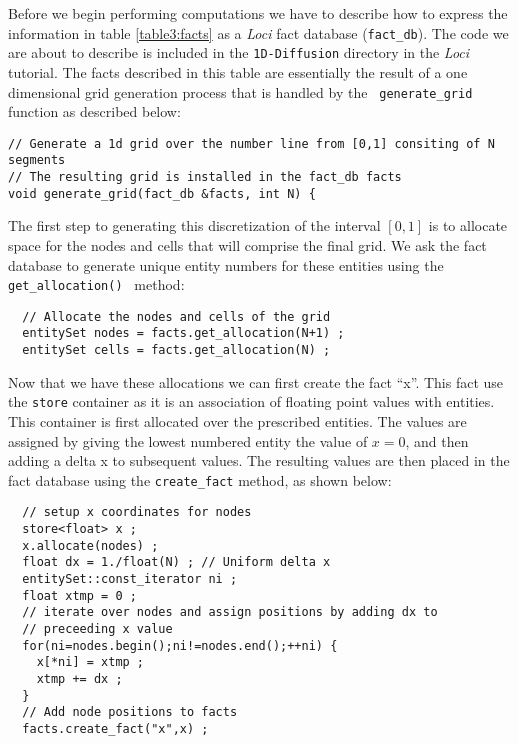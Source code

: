\documentclass[10pt,epsf,letterpaper,twoside]{book}
\begin{document}
Before we begin performing computations we have to describe how to
express the information in table \ref{table3:facts} as a {\it Loci} fact
database ({\tt fact\_db}).  The code we are about to describe is
included in the {\tt 1D-Diffusion} directory in the {\it Loci} tutorial.
The facts described in this table are essentially the result of a one
dimensional grid generation process that is handled by the {\tt
  generate\_grid} function as described below:
\begin{verbatim}
// Generate a 1d grid over the number line from [0,1] consiting of N segments
// The resulting grid is installed in the fact_db facts 
void generate_grid(fact_db &facts, int N) {
\end{verbatim}
The first step to generating this discretization of the interval
$[0,1]$ is to allocate space for the nodes and cells that will
comprise the final grid.  We ask the fact database to generate unique
entity numbers for these entities using the {\tt get\_allocation() }
method:
\begin{verbatim}
  // Allocate the nodes and cells of the grid
  entitySet nodes = facts.get_allocation(N+1) ;
  entitySet cells = facts.get_allocation(N) ;
\end{verbatim}
Now that we have these allocations we can first create the fact
``x''.  This fact use the {\tt store} container as it is an
association of floating point values with entities.  This container is
first allocated over the prescribed entities.  The values are assigned
by giving the lowest numbered entity the value of $x=0$, and then
adding a delta x to subsequent values.  The resulting values are then
placed in the fact database using the {\tt create\_fact} method, as
shown below:
\begin{verbatim}
  // setup x coordinates for nodes
  store<float> x ;
  x.allocate(nodes) ;
  float dx = 1./float(N) ; // Uniform delta x
  entitySet::const_iterator ni ;
  float xtmp = 0 ;
  // iterate over nodes and assign positions by adding dx to
  // preceeding x value
  for(ni=nodes.begin();ni!=nodes.end();++ni) {
    x[*ni] = xtmp ;
    xtmp += dx ;
  }
  // Add node positions to facts
  facts.create_fact("x",x) ;
\end{verbatim}
\end{document}
